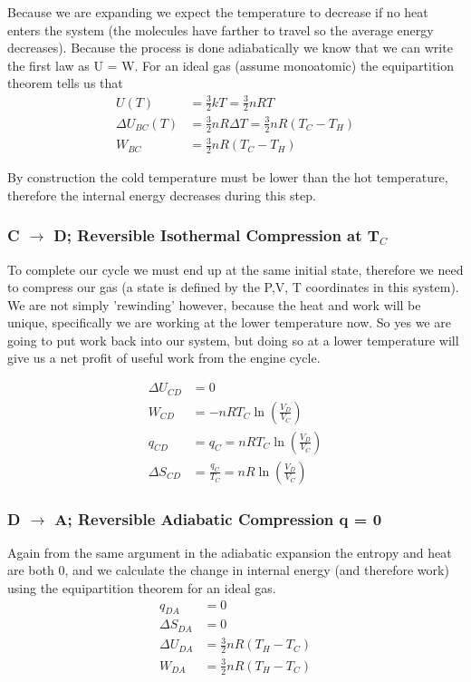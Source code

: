 \documentclass{article}
\begin{document}
Because we are expanding we expect the temperature to decrease if no heat enters the system (the molecules have farther to travel so the average energy decreases). 
Because the process is done adiabatically we know that we can write the first law as U = W.
For an ideal gas (assume monoatomic) the equipartition theorem tells us that
\begin{equation}
\begin{split}
    U(T) &= \frac{3}{2}kT = \frac{3}{2}nRT \\
    \Delta U_{BC}(T) &= \frac{3}{2}nR\Delta T = \frac{3}{2}nR(T_C-T_H)  \\
    W_{BC} &= \frac{3}{2}nR(T_C-T_H) 
\end{split}
\end{equation}

By construction the cold temperature must be lower than the hot temperature, therefore the internal energy decreases during this step. 

\subsubsection*{C $\rightarrow$ D; Reversible Isothermal Compression at T$_C$}
To complete our cycle we must end up at the same initial state, therefore we need to compress our gas (a state is defined by the P,V, T coordinates in this system). 
We are not simply 'rewinding' however, because the heat and work will be unique, specifically we are working at the lower temperature now. 
So yes we are going to put work back into our system, but doing so at a lower temperature will give us a net profit of useful work from the engine cycle.  

\begin{equation}
\begin{split}
\Delta U_{CD} &= 0 \\
W_{CD} &= -nRT_C\ln\left(\frac{V_D}{V_C}\right) \\
q_{CD} &= q_C = nRT_C\ln\left(\frac{V_D}{V_C}\right) \\
\Delta S_{CD} &= \frac{q_C}{T_C} = nR\ln\left(\frac{V_D}{V_C}\right)
\end{split}
\end{equation}

\subsubsection*{D $\rightarrow$ A; Reversible Adiabatic Compression q = 0}
Again from the same argument in the adiabatic expansion the entropy and heat are both 0, and we calculate the change in internal energy (and therefore work) using the equipartition theorem for an ideal gas. 
\begin{equation}
\begin{split}
    q_{DA} &= 0 \\
    \Delta S_{DA} &= 0\\
    \Delta U_{DA} &= \frac{3}{2} nR(T_H-T_C)\\
    W_{DA} &= \frac{3}{2} nR(T_H-T_C)
    \end{split}
\end{equation}
\end{document}
